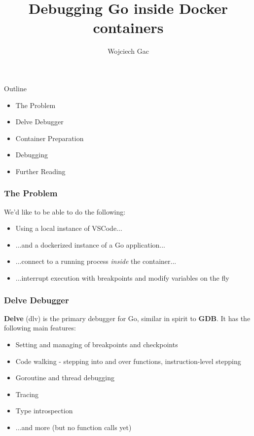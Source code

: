 \documentclass[pdf,xcolor=dvipsnames,noparindent]{beamer}
\title{Debugging Go inside Docker containers}
\author{Wojciech Gac}
\begin{document}
\begin{frame}
  \titlepage
\end{frame}

\begin{frame}{Outline}
  \pause
  \begin{itemize}
  \item The Problem
    \pause
  \item Delve Debugger
    \pause
  \item Container Preparation
    \pause
  \item Debugging
    \pause
  \item Further Reading
  \end{itemize}
\end{frame}

\begin{frame}
  \frametitle{The Problem}
  We'd like to be able to do the following:
  \pause
  \begin{itemize}
  \item Using a local instance of VSCode...
    \pause
  \item ...and a dockerized instance of a Go application...
    \pause
  \item ...connect to a running process \emph{inside} the container...
    \pause
  \item ...interrupt execution with breakpoints and modify variables on the fly
  \end{itemize}
  
\end{frame}

\begin{frame}
  \frametitle{Delve Debugger}
  \textbf{Delve} (dlv) is the primary debugger for Go, similar in
  spirit to \textbf{GDB}. It has the following main features:
  \pause
  \begin{itemize}
  \item Setting and managing of breakpoints and checkpoints
    \pause
  \item Code walking - stepping into and over functions, instruction-level stepping
    \pause
  \item Goroutine and thread debugging
    \pause
  \item Tracing
    \pause
  \item Type introspection
    \pause
  \item ...and more (but no function calls yet)
  \end{itemize}
  
\end{frame}
\end{document}
